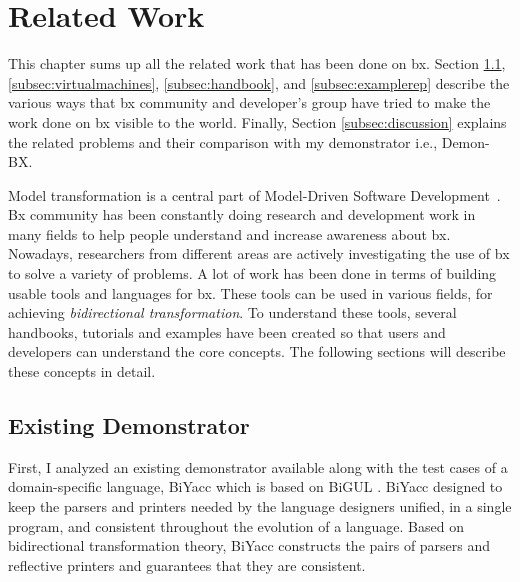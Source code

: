 \section{Related Work}\label{sec:relatedwork}
This chapter sums up all the related work that has been done on bx. Section \ref{subsec:existingdemo}, \ref{subsec:virtualmachines}, \ref{subsec:handbook}, and \ref{subsec:examplerep} describe the various ways that bx community and developer's group have tried to make the work done on bx visible to the world. Finally, Section \ref{subsec:discussion} explains the related problems and their comparison with my demonstrator i.e., Demon-BX. 

Model transformation is a central part of Model-Driven Software Development~\cite{bx-grace}\cite{bx-dagstuhl}. Bx community has been constantly doing research and development work in many fields to help people understand and increase awareness about bx. Nowadays, researchers from different areas are actively investigating the use of bx to solve a variety of problems. A lot of work has been done in terms of building usable tools and languages for bx. These tools can be used in various fields, for achieving \textit{bidirectional transformation}. To understand these tools, several handbooks, tutorials and examples have been created so that users and developers can understand the core concepts. The following sections will describe these concepts in detail.

\subsection{Existing Demonstrator}\label{subsec:existingdemo}
First, I analyzed an existing demonstrator available along with the test cases of a domain-specific language, BiYacc \cite{biyacc} which is based on BiGUL \cite{bigul}. BiYacc designed to keep the parsers and printers needed by the language designers unified, in a single program, and consistent throughout the evolution of a language. Based on bidirectional transformation theory, BiYacc constructs the pairs of parsers and reflective printers and guarantees that they are consistent.

